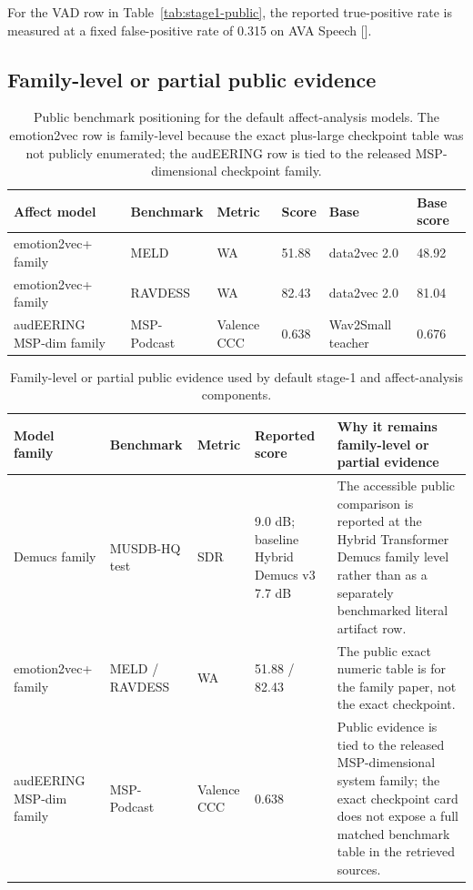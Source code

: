 For the VAD row in Table~\ref{tab:stage1-public}, the reported true-positive rate is measured at a fixed false-positive rate of 0.315 on AVA Speech [\cite{marblenet_vad_modelcard}].

\subsection{Family-level or partial public evidence}

\begin{table}[H]
\centering
\scriptsize
\begin{tabularx}{\textwidth}{L{2.8cm}L{1.8cm}L{1.4cm}L{1.2cm}L{2.6cm}L{1.2cm}}
\toprule
Affect model & Benchmark & Metric & Score & Base & Base score \\
\midrule
emotion2vec+ family & MELD & WA & 51.88 & data2vec 2.0 & 48.92 \\
emotion2vec+ family & RAVDESS & WA & 82.43 & data2vec 2.0 & 81.04 \\
audEERING MSP-dim family & MSP-Podcast & Valence CCC & 0.638 & Wav2Small teacher & 0.676 \\
\bottomrule
\end{tabularx}
\caption{Public benchmark positioning for the default affect-analysis models. The emotion2vec row is family-level because the exact plus-large checkpoint table was not publicly enumerated; the audEERING row is tied to the released MSP-dimensional checkpoint family.}
\label{tab:affect-public}
\end{table}

\begin{table}[H]
\centering
\scriptsize
\begin{tabularx}{\textwidth}{L{2.3cm}L{2.4cm}L{1.4cm}L{1.5cm}Y}
\toprule
Model family & Benchmark & Metric & Reported score & Why it remains family-level or partial evidence \\
\midrule
Demucs  family & MUSDB-HQ test & SDR & 9.0 dB; baseline Hybrid Demucs v3 7.7 dB & The accessible public comparison is reported at the Hybrid Transformer Demucs family level rather than as a separately benchmarked literal  artifact row. \\
emotion2vec+ family & MELD / RAVDESS & WA & 51.88 / 82.43 & The public exact numeric table is for the  family paper, not the exact  checkpoint. \\
audEERING MSP-dim family & MSP-Podcast & Valence CCC & 0.638 & Public evidence is tied to the released MSP-dimensional system family; the exact checkpoint card does not expose a full matched benchmark table in the retrieved sources. \\
\bottomrule
\end{tabularx}
\caption{Family-level or partial public evidence used by default stage-1 and affect-analysis components.}
\label{tab:stage1-family-evidence}
\end{table}

